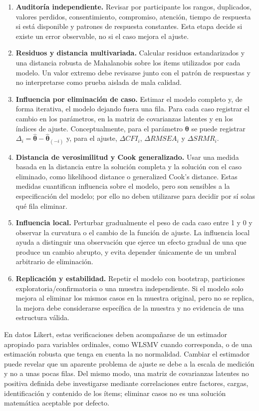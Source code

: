 \documentclass[11pt,a4paper]{article}
\begin{document}
\begin{enumerate}[leftmargin=*]
  \item \textbf{Auditoría independiente.} Revisar por participante los rangos, duplicados, valores perdidos, consentimiento, compromiso, atención, tiempo de respuesta si está disponible y patrones de respuesta constantes. Esta etapa decide si existe un error observable, no si el caso mejora el ajuste.
  \item \textbf{Residuos y distancia multivariada.} Calcular residuos estandarizados y una distancia robusta de Mahalanobis sobre los ítems utilizados por cada modelo. Un valor extremo debe revisarse junto con el patrón de respuestas y no interpretarse como prueba aislada de mala calidad.
  \item \textbf{Influencia por eliminación de caso.} Estimar el modelo completo y, de forma iterativa, el modelo dejando fuera una fila. Para cada caso registrar el cambio en los parámetros, en la matriz de covarianzas latentes y en los índices de ajuste. Conceptualmente, para el parámetro $\boldsymbol{\theta}$ se puede registrar $\Delta_i=\hat{\boldsymbol{\theta}}-\hat{\boldsymbol{\theta}}_{(-i)}$ y, para el ajuste, $\Delta CFI_i$, $\Delta RMSEA_i$ y $\Delta SRMR_i$.
  \item \textbf{Distancia de verosimilitud y Cook generalizado.} Usar una medida basada en la distancia entre la solución completa y la solución con el caso eliminado, como likelihood distance o generalized Cook's distance. Estas medidas cuantifican influencia sobre el modelo, pero son sensibles a la especificación del modelo; por ello no deben utilizarse para decidir por sí solas qué fila eliminar.
  \item \textbf{Influencia local.} Perturbar gradualmente el peso de cada caso entre 1 y 0 y observar la curvatura o el cambio de la función de ajuste. La influencia local ayuda a distinguir una observación que ejerce un efecto gradual de una que produce un cambio abrupto, y evita depender únicamente de un umbral arbitrario de eliminación.
  \item \textbf{Replicación y estabilidad.} Repetir el modelo con bootstrap, particiones exploratoria/confirmatoria o una muestra independiente. Si el modelo solo mejora al eliminar los mismos casos en la muestra original, pero no se replica, la mejora debe considerarse específica de la muestra y no evidencia de una estructura válida.
\end{enumerate}

En datos Likert, estas verificaciones deben acompañarse de un estimador apropiado para variables ordinales, como WLSMV cuando corresponda, o de una estimación robusta que tenga en cuenta la no normalidad. Cambiar el estimador puede revelar que un aparente problema de ajuste se debe a la escala de medición y no a unas pocas filas. Del mismo modo, una matriz de covarianzas latentes no positiva definida debe investigarse mediante correlaciones entre factores, cargas, identificación y contenido de los ítems; eliminar casos no es una solución matemática aceptable por defecto.
\end{document}
